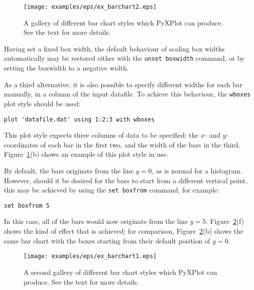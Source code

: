 \begin{figure}
\begin{center}
\texttt{[image: examples/eps/ex\_barchart2.eps]}
\end{center}
\caption{A gallery of different bar chart styles which PyXPlot can produce. See the text for more details.}
\label{fig:ex_barchart2}
\end{figure}

Having set a fixed box width, the default behaviour of scaling box widths
automatically may be restored either with the \texttt{unset boxwidth} command,
or by setting the boxwidth to a negative width.

As a third alternative, it is also possible to specify different widths for
each bar manually, in a column of the input datafile. To achieve this
behaviour, the \texttt{wboxes} plot style should be used:

\begin{verbatim} 
plot 'datafile.dat' using 1:2:3 with wboxes
\end{verbatim}

\noindent This plot style expects three columns of data to be specified: the
$x$- and $y$-coordinates of each bar in the first two, and the width of the
bars in the third.  Figure~\ref{fig:ex_barchart2}(b) shows an example of this
plot style in use.

By default, the bars originate from the line $y=0$, as is normal for a
histogram. However, should it be desired for the bars to start from a different
vertical point, this may be achieved by using the \texttt{set boxfrom} command,
for example:

\begin{verbatim} 
set boxfrom 5
\end{verbatim}

\noindent In this case, all of the bars would now originate from the line
$y=5$. Figure~\ref{fig:ex_barchart1}(f) shows the kind of effect that is
achieved; for comparison, Figure~\ref{fig:ex_barchart1}(b) shows the same bar
chart with the boxes starting from their default position of $y=0$.

\begin{figure}
\begin{center}
\texttt{[image: examples/eps/ex\_barchart1.eps]}
\end{center}
\caption{A second gallery of different bar chart styles which PyXPlot can produce. See the text for more details.}
\label{fig:ex_barchart1}
\end{figure}

